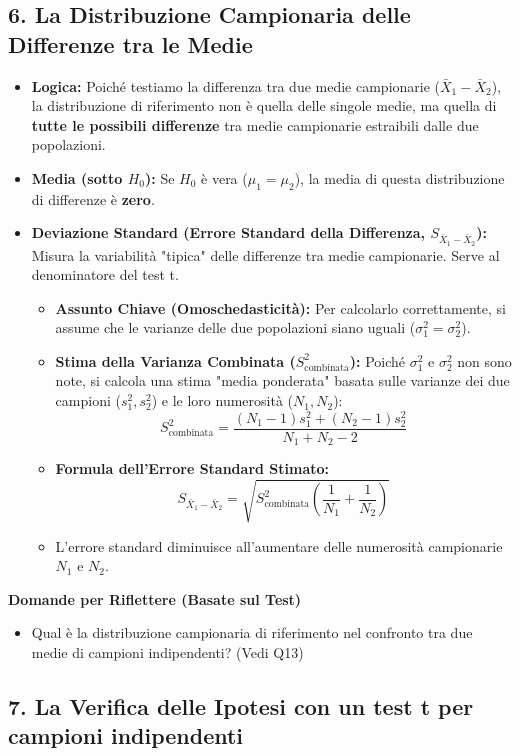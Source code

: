 \documentclass[12pt, a4paper]{article}
\newenvironment{reflectionbox}{%
    \medskip
    \begin{framed}\par\noindent
    \textbf{\color{boxtitlecolor}Domande per Riflettere (Basate sul Test)} \par
    \begin{itemize}[leftmargin=*, label=$\blacktriangleright$]
}{%
    \end{itemize}\par
    \end{framed}
    \medskip
}
\newcommand{\popmean}{\mu}
\newcommand{\samplemean}{\bar{X}}
\newcommand{\popvar}{\sigma^2}
\newcommand{\samplevar}{s^2}
\newcommand{\Hnull}{H_0} %
\newcommand{\Spool}{S^2_{\text{combinata}}} %
\newcommand{\SEdiff}{S_{\samplemean_1 - \samplemean_2}} %
\begin{document}
\subsection*{6. La Distribuzione Campionaria delle Differenze tra le Medie}
\begin{itemize}
    \item \textbf{Logica:} Poiché testiamo la differenza tra due medie campionarie ($\samplemean_1 - \samplemean_2$), la distribuzione di riferimento non è quella delle singole medie, ma quella di \textbf{tutte le possibili differenze} tra medie campionarie estraibili dalle due popolazioni.
    \item \textbf{Media (sotto $\Hnull$):} Se $\Hnull$ è vera ($\popmean_1 = \popmean_2$), la media di questa distribuzione di differenze è \textbf{zero}.
    \item \textbf{Deviazione Standard (Errore Standard della Differenza, $\SEdiff$):} Misura la variabilità "tipica" delle differenze tra medie campionarie. Serve al denominatore del test t.
        \begin{itemize}
            \item \textbf{Assunto Chiave (Omoschedasticità):} Per calcolarlo correttamente, si assume che le varianze delle due popolazioni siano uguali ($\popvar_1 = \popvar_2$).
            \item \textbf{Stima della Varianza Combinata ($\Spool$):} Poiché $\popvar_1$ e $\popvar_2$ non sono note, si calcola una stima "media ponderata" basata sulle varianze dei due campioni ($\samplevar_1, \samplevar_2$) e le loro numerosità ($N_1, N_2$):
              $$ \Spool = \frac{(N_1-1)\samplevar_1 + (N_2-1)\samplevar_2}{N_1+N_2-2} $$
            \item \textbf{Formula dell'Errore Standard Stimato:}
              $$ \SEdiff = \sqrt{\Spool \left( \frac{1}{N_1} + \frac{1}{N_2} \right)} $$
            \item L'errore standard diminuisce all'aumentare delle numerosità campionarie $N_1$ e $N_2$.
        \end{itemize}
\end{itemize}

\begin{reflectionbox}
    \item Qual è la distribuzione campionaria di riferimento nel confronto tra due medie di campioni indipendenti? (Vedi Q13)
\end{reflectionbox}

\subsection*{7. La Verifica delle Ipotesi con un test t per campioni indipendenti}
\end{document}
